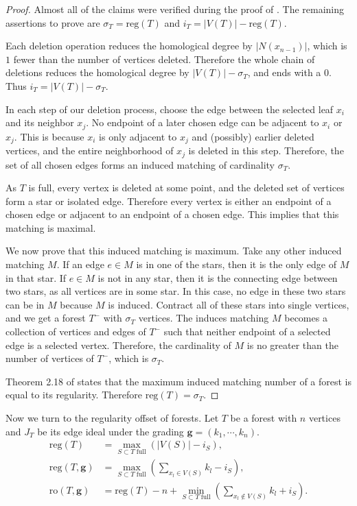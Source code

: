 \documentclass[dvipsnames,10pt]{article}
\newcommand{\reg}{\mathrm{reg}}
\begin{document}
\begin{proof}
    Almost all of the claims were verified during the proof of . The remaining assertions to prove are $\sigma_T = \mathrm{reg}(T)$ and $i_T=|V(T)|-\reg(T)$.

    Each deletion operation reduces the homological degree by $|N(x_{n-1})|$, which is $1$ fewer than the number of vertices deleted. Therefore the whole chain of deletions reduces the homological degree by $|V(T)|-\sigma_T$, and ends with a $0$. Thus $i_T=|V(T)|-\sigma_T$.

    In each step of our deletion process, choose the edge between the selected leaf $x_i$ and its neighbor $x_j$. No endpoint of a later chosen edge can be adjacent to $x_i$ or $x_j$. This is because $x_i$ is only adjacent to $x_j$ and (possibly) earlier deleted vertices, and the entire neighborhood of $x_j$ is deleted in this step. Therefore, the set of all chosen edges forms an induced matching of cardinality $\sigma_T$.

    As $T$ is full, every vertex is deleted at some point, and the deleted set of vertices form a star or isolated edge. Therefore every vertex is either an endpoint of a chosen edge or adjacent to an endpoint of a chosen edge. This implies that this matching is maximal.

    We now prove that this induced matching is maximum. Take any other induced matching $M$. If an edge $e\in M$ is in one of the stars, then it is the only edge of $M$ in that star. If $e\in M$ is not in any star, then it is the connecting edge between two stars, as all vertices are in some star. In this case, no edge in these two stars can be in $M$ because $M$ is induced. Contract all of these stars into single vertices, and we get a forest $T^-$ with $\sigma_T$ vertices. The induces matching $M$ becomes a collection of vertices and edges of $T^-$ such that neither endpoint of a selected edge is a selected vertex. Therefore, the cardinality of $M$ is no greater than the number of vertices of $T^-$, which is $\sigma_T$.
    
    Theorem 2.18 of \cite{Zheng31122004} states that the maximum induced matching number of a forest is equal to its regularity. Therefore $\reg(T)=\sigma_T$.
\end{proof}

Now we turn to the regularity offset of forests. Let $T$ be a forest with $n$ vertices and $J_T$ be its edge ideal under the grading $\mathbf{g}=(k_1,\cdots,k_n)$.
\begin{align*}
    \mathrm{reg}(T) &= \max_{S\subset T\;\text{full}}\left( |V(S)| - i_S \right),\\
    \mathrm{reg}(T,\mathbf{g}) &= \max_{S\subset T\;\text{full}}\left( \sum_{x_l\in V(S)}k_l - i_S \right),\\
    \mathrm{ro}(T,\mathbf{g}) &= \mathrm{reg}(T) -n + \min_{S\subset T\;\text{full}} \left( \sum_{x_l\notin V(S)}k_l + i_S \right).
\end{align*}
\end{document}
